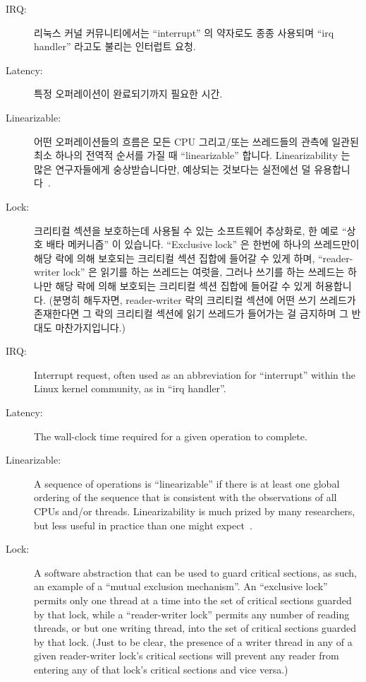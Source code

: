 \begin{description}
\fi

\item[IRQ:]
	리눅스 커널 커뮤니티에서는 ``interrupt'' 의 약자로도 종종 사용되며
	``irq handler'' 라고도 불리는 인터럽트 요청.
\item[Latency:]
	특정 오퍼레이션이 완료되기까지 필요한 시간.
\item[Linearizable:]
	어떤 오퍼레이션들의 흐름은 모든 CPU 그리고/또는 쓰레드들의 관측에
	일관된 최소 하나의 전역적 순서를 가질 때 ``linearizable'' 합니다.
	Linearizability 는 많은 연구자들에게 숭상받습니다만, 예상되는 것보다는
	실전에선 덜 유용합니다~\cite{AndreasHaas2012FIFOisnt}.
\item[Lock:]
	크리티컬 섹션을 보호하는데 사용될 수 있는 소프트웨어 추상화로, 한 예로
	``상호 배타 메커니즘'' 이 있습니다.
	``Exclusive lock'' 은 한번에 하나의 쓰레드만이 해당 락에 의해 보호되는
	크리티컬 섹션 집합에 들어갈 수 있게 하며, ``reader-writer lock'' 은
	읽기를 하는 쓰레드는 여럿을, 그러나 쓰기를 하는 쓰레드는 하나만 해당
	락에 의해 보호되는 크리티컬 섹션 집합에 들어갈 수 있게 허용합니다.
	(분명히 해두자면, reader-writer 락의 크리티컬 섹션에 어떤 쓰기 쓰레드가
	존재한다면 그 락의 크리티컬 섹션에 읽기 쓰레드가 들어가는 걸 금지하며
	그 반대도 마찬가지입니다.)

\iffalse

\item[IRQ:]
	Interrupt request, often used as an abbreviation for ``interrupt''
	within the Linux kernel community, as in ``irq handler''.
\item[Latency:]
	The wall-clock time required for a given operation to complete.
\item[Linearizable:]
	A sequence of operations is ``linearizable'' if there is at
	least one global ordering of the sequence that is consistent
	with the observations of all CPUs and/or threads.
	Linearizability is much prized by many researchers, but less
	useful in practice than one might
	expect~\cite{AndreasHaas2012FIFOisnt}.
\item[Lock:]
	A software abstraction that can be used to guard critical sections,
	as such, an example of a ``mutual exclusion mechanism''.
	An ``exclusive lock'' permits only one thread at a time into the
	set of critical sections guarded by that lock, while a
	``reader-writer lock'' permits any number of reading
	threads, or but one writing thread, into the set of critical
	sections guarded by that lock.  (Just to be clear, the presence
	of a writer thread in any of a given reader-writer lock's
	critical sections will prevent any reader from entering
	any of that lock's critical sections and vice versa.)


\end{description}
